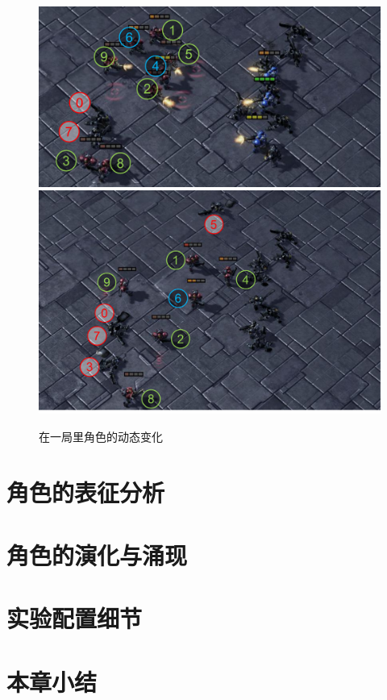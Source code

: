 \begin{figure}
    \includegraphics[height=0.24\linewidth]{figures/dynamic/10m_vs_11m-g3.pdf}\hfill
    \includegraphics[height=0.24\linewidth]{figures/dynamic/10m_vs_11m-g4.pdf}\\ 
    \hfill
    \caption{在一局里角色的动态变化}\label{fig:dynamic_role-10m_vs_11m}
\end{figure}



\section{角色的表征分析}\label{sec:role-representation}

\section{角色的演化与涌现}\label{sec:role-evolution}

\section{实验配置细节}\label{sec:exp-detail}

\section{本章小结}

